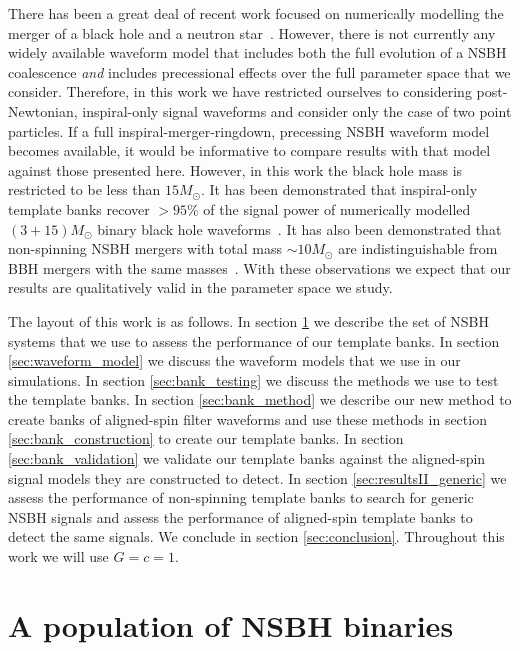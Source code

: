 There has been a great deal of recent work focused on numerically 
modelling the merger of a black hole and a neutron 
star~\cite{Duez:2009yz,Shibata:2011jka,Pannarale:2012ux,Lackey:2013axa,
Foucart:2013psa}. However, there is not currently any widely available waveform 
model 
that includes both the full evolution of a \ac{NSBH} coalescence \emph{and} 
includes precessional effects over the full parameter space that we consider.
Therefore, in this work we have restricted ourselves to considering 
post-Newtonian, inspiral-only signal waveforms and consider only the case of two 
point particles. If a full 
inspiral-merger-ringdown, precessing \ac{NSBH} waveform model 
becomes available, it would be informative to compare results with that model 
against those presented here. However, in this work the black hole mass is 
restricted to be less than $15M_{\odot}$. It has been demonstrated that 
inspiral-only template banks recover $> 95\%$ of the signal power of 
numerically modelled $(3+15)M_{\odot}$ binary black hole 
waveforms~\cite{Brown:2012nn,Smith:2013mfa}. It has also been demonstrated that 
non-spinning \ac{NSBH} mergers with total mass $\sim 10M_{\odot}$ are 
indistinguishable from \ac{BBH} mergers with the same 
masses~\cite{Foucart:2013psa}. With these observations we expect that 
our results are qualitatively valid in the parameter space we study.

The layout of this work is as follows. In section \ref{sec:nsbhpop} we describe
the set of \ac{NSBH} systems that we use to assess
the performance of our template banks. In section \ref{sec:waveform_model} we
discuss the waveform models that we use in our simulations. In section
\ref{sec:bank_testing} we discuss the methods we use to test the template
banks. In section \ref{sec:bank_method} we describe our new method to
create banks of aligned-spin filter waveforms and use these methods in section
\ref{sec:bank_construction} to create our template banks. In section
\ref{sec:bank_validation} we validate our template banks against the
aligned-spin signal models they are constructed to detect. In section
\ref{sec:resultsII_generic} we assess the performance of non-spinning template 
banks to search for generic \ac{NSBH} signals and assess the performance of 
aligned-spin template banks to detect the same signals. We conclude in section 
\ref{sec:conclusion}. Throughout this work we will use $G = c = 1$.

\section{A population of NSBH binaries}
\label{sec:nsbhpop}

